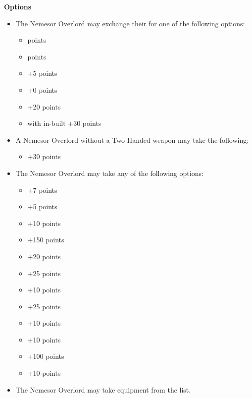 \newpage
\vspace*{1em}
\begin{minipage}[t][\textheight][t]{0.72\textwidth}
	\textbf{Options}
	\begin{itemize}
		\item The Nemesor Overlord may exchange their  for one of the following options:
		\begin{itemize}			
			\item {}  points
			\item {}  points
			\item {} \dotfill +5 points
			\item {} \dotfill +0 points
			\item {} \dotfill +20 points
			\item {} with in-built  \dotfill +30 points
		\end{itemize}
		\item A Nemesor Overlord without a Two-Handed weapon may take the following:
		\begin{itemize}
			\item {} \dotfill +30 points
		\end{itemize}
		\item The Nemesor Overlord may take any of the following options:
		\begin{itemize}
			\item {} \dotfill +7 points
			\item {} \dotfill +5 points
			\item {} \dotfill +10 points
			\item {} \dotfill +150 points
			\item {} \dotfill +20 points
			\item {} \dotfill +25 points
			\item {} \dotfill +10 points
			\item {} \dotfill +25 points
			\item {} \dotfill +10 points
			\item {} \dotfill +10 points
			\item {} \dotfill +100 points
			\item {} \dotfill +10 points
		\end{itemize}
		\item The Nemesor Overlord may take equipment from the  list.
	\end{itemize}
\end{minipage}

